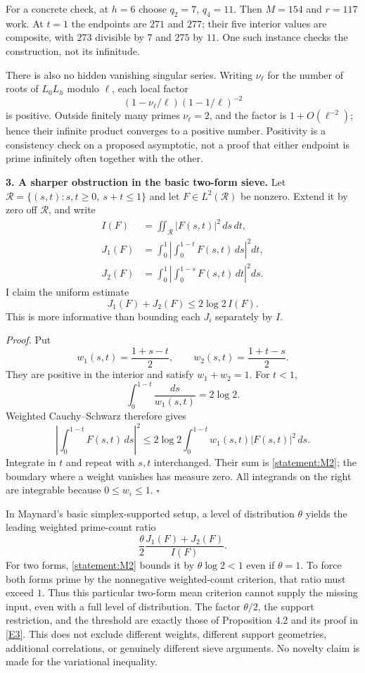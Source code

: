 \documentclass[11pt,a4paper]{article}
\newcommand{\eref}[2]{\hyperlink{extra:#1:#2}{[E#2]}}
\numberwithin{equation}{section}
\begin{document}
For a concrete check, at $h=6$ choose $q_2=7$, $q_4=11$. Then $M=154$ and
$r=117$ work. At $t=1$ the endpoints are $271$ and $277$; their five interior
values are composite, with $273$ divisible by $7$ and $275$ by $11$.
One such instance checks the construction, not its infinitude.

There is also no hidden vanishing singular series. Writing $\nu_\ell$ for
the number of roots of $L_0L_h$ modulo $\ell$, each local factor
\[
 (1-\nu_\ell/\ell)(1-1/\ell)^{-2}
\]
is positive. Outside finitely many primes $\nu_\ell=2$, and the factor is
$1+O(\ell^{-2})$; hence their infinite product converges to a positive
number. Positivity is a consistency check on a proposed asymptotic, not a
proof that either endpoint is prime infinitely often together with the other.

\medskip
\textbf{3. A sharper obstruction in the basic two-form sieve.}
Let $\mathcal R=\{(s,t):s,t\geq0,\ s+t\leq1\}$ and let $F\in L^2(\mathcal R)$
be nonzero. Extend it by zero off $\mathcal R$, and write
\begin{align*}
 I(F)&=\iint_{\mathcal R}|F(s,t)|^2\,ds\,dt,\\
 J_1(F)&=\int_0^1\left|\int_0^{1-t}F(s,t)\,ds\right|^2dt,\\
 J_2(F)&=\int_0^1\left|\int_0^{1-s}F(s,t)\,dt\right|^2ds.
\end{align*}
I claim the uniform estimate
\begin{equation}\label{statement:M2}
 J_1(F)+J_2(F)\leq2\log2\,I(F).
\end{equation}
This is more informative than bounding each $J_i$ separately by $I$.

\emph{Proof.} Put
\[
 w_1(s,t)=\frac{1+s-t}{2},\qquad
 w_2(s,t)=\frac{1+t-s}{2}.
\]
They are positive in the interior and satisfy $w_1+w_2=1$. For $t<1$,
\[
 \int_0^{1-t}\frac{ds}{w_1(s,t)}=2\log2.
\]
Weighted Cauchy--Schwarz therefore gives
\[
 \left|\int_0^{1-t}F(s,t)\,ds\right|^2
 \leq2\log2\int_0^{1-t}w_1(s,t)|F(s,t)|^2\,ds.
\]
Integrate in $t$ and repeat with $s,t$ interchanged. Their sum is
\eqref{statement:M2}; the boundary where a weight vanishes has measure zero.
All integrands on the right are integrable because $0\leq w_i\leq1$.
$\square$

In Maynard's basic simplex-supported setup, a level of distribution $\theta$
yields the leading weighted prime-count ratio
\[
 \frac{\theta}{2}\frac{J_1(F)+J_2(F)}{I(F)}.
\]
For two forms, \eqref{statement:M2} bounds it by $\theta\log2<1$ even if
$\theta=1$. To force both forms prime by the nonnegative weighted-count
criterion, that ratio must exceed $1$. Thus this particular two-form mean
criterion cannot supply the missing input, even with a full level of
distribution. The factor $\theta/2$, the support restriction, and the
threshold are exactly those of Proposition 4.2 and its proof in
\eref{statement}{3}. This does not exclude different weights, different support
geometries, additional correlations, or genuinely different sieve arguments.
No novelty claim is made for the variational inequality.
\end{document}
